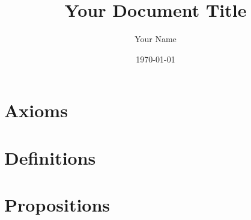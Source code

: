 \documentclass{report}
\title{Your Document Title}
\author{Your Name}
\date{\today}
\begin{document}
\maketitle %

\tableofcontents %

\newpage %

\chapter{Axioms} %

\newpage %

\chapter{Definitions} %

\newpage %

\chapter{Propositions} %

\end{document}
